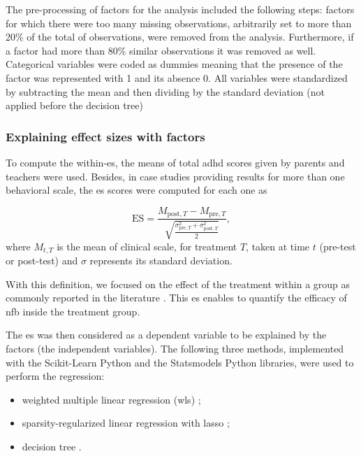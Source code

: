 The pre-processing of factors for the analysis included the following steps: factors for which there were too many 
missing observations, arbitrarily set to more than 20\% of the total of observations, were removed from the analysis. 
Furthermore, if a factor had more than 80\% similar observations it was removed as well. Categorical variables were 
coded as dummies meaning that the presence of the factor was represented with 1 and its absence 0. All variables 
were standardized by subtracting the mean and then dividing by the standard deviation (not applied before the decision tree)

\subsubsection{Explaining effect sizes with factors}

To compute the within-\gls{es}, the  means of total \gls{adhd} scores given by parents and teachers were used. Besides, 
in case studies providing results for more than one behavioral scale, the \gls{es} scores were computed for each one as 

\begin{equation*}
\label{eq:factors_effect_size_within_subject}
\text{ES} = \frac{M_{\text{post},T} - M_{\text{pre},T}}{\sqrt{\frac{\sigma_{\text{pre},T}^2 + \sigma_{\text{post},T}^2}{2}}},
\end{equation*} 
where $M_{t,T}$ is the mean of clinical scale, for treatment $T$, taken at time $t$ (pre-test or post-test) and $\sigma$ represents 
its standard deviation.

With this definition, we focused on the effect of the treatment within a group \citep{Cohen1988} as commonly reported 
in the literature \citep{Arns2009, Maurizio2014, Strehl2017}. This \gls{es} enables to quantify 
the efficacy of \gls{nfb} inside the treatment group. 

The \gls{es} was then considered as a dependent variable to be explained by the factors (the independent variables). 
The following three methods, implemented with the Scikit-Learn Python \citep[version 0.18.1]{Pedregosa2011} and the Statsmodels Python
\citep[version 0.8.0]{Seabold2010} libraries, were used to perform the regression:
\begin{itemize}
  \item weighted multiple linear regression (\gls{wls}) \citep{Montgomery2012};
	\item sparsity-regularized linear regression with \gls{lasso} \citep{Tibshirani1996};
	\item decision tree \citep{Quinlan1986}.
\end{itemize}

